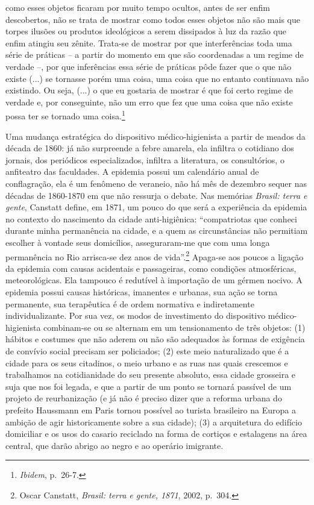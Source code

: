 como esses objetos ficaram por muito tempo ocultos, antes de ser enfim
descobertos, não se trata de mostrar como todos esses objetos não são
mais que torpes ilusões ou produtos ideológicos a serem dissipados à luz
da razão que enfim atingiu seu zênite. Trata-se de mostrar por que
interferências toda uma série de práticas -- a partir do momento em que
são coordenadas a um regime de verdade --, por que inferências essa
série de práticas pôde fazer que o que não existe (...) se tornasse
porém uma coisa, uma coisa que no entanto continuava não existindo. Ou
seja, (...) o que eu gostaria de mostrar é que foi certo regime de
verdade e, por conseguinte, não um erro que fez que uma coisa que não
existe possa ter se tornado uma coisa.\footnote{\emph{Ibidem}, p.~26-7.}

Uma mudança estratégica do dispositivo médico-higienista a partir de
meados da década de 1860: já não surpreende a febre amarela, ela
infiltra o cotidiano dos jornais, dos periódicos especializados,
infiltra a literatura, os consultórios, o anfiteatro das faculdades. A
epidemia possui um calendário anual de conflagração, ela é um fenômeno
de veraneio, não há mês de dezembro sequer nas décadas de 1860-1870 em
que não ressurja o debate. Nas memórias \emph{Brasil: terra e gente},
Canstatt define, em 1871, um pouco do que será a experiência da epidemia
no contexto do nascimento da cidade anti-higiênica: ``compatriotas que
conheci durante minha permanência na cidade, e a quem as circunstâncias
não permitiam escolher à vontade seus domicílios, asseguraram-me que com
uma longa permanência no Rio arrisca-se dez anos de vida''.\footnote{Oscar
  Canstatt, \emph{Brasil: terra e gente, 1871}, 2002, p.~304.} Apaga-se
aos poucos a ligação da epidemia com causas acidentais e passageiras,
como condições atmosféricas, meteorológicas. Ela tampouco é redutível à
importação de um gérmen nocivo. A epidemia possui causas históricas,
imanentes e urbanas, sua ação se torna permanente, sua terapêutica é de
ordem normativa e indiretamente individualizante. Por sua vez, os modos
de investimento do dispositivo médico-higienista combinam-se ou se
alternam em um tensionamento de três objetos: (1) hábitos e costumes que
não aderem ou não são adequados às formas de exigência de convívio
social precisam ser policiados; (2) este meio naturalizado que é a
cidade para os seus citadinos, o meio urbano e as ruas nas quais
crescemos e trabalhamos na cotidianidade do seu presente absoluto, essa
cidade grosseira e suja que nos foi legada, e que a partir de um ponto
se tornará passível de um projeto de reurbanização (e já não é preciso
dizer que a reforma urbana do prefeito Haussmann em Paris tornou
possível ao turista brasileiro na Europa a ambição de agir
historicamente sobre a sua cidade); (3) a arquitetura do edifício
domiciliar e os usos do casario reciclado na forma de cortiços e
estalagens na área central, que darão abrigo ao negro e ao operário
imigrante.

